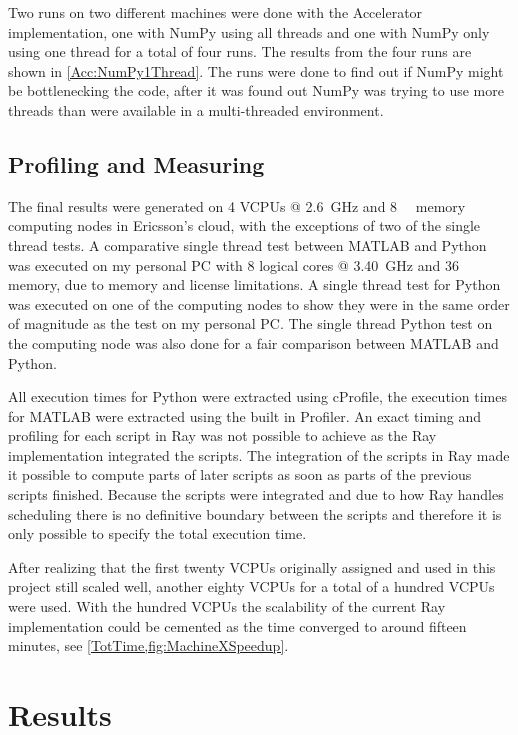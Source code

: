 \documentclass[12pt, a4paper]{article}
\begin{document}
Two runs on two different machines were done with the Accelerator implementation, one with NumPy using all threads and one with NumPy only using one thread for a total of four runs.
The results from the four runs are shown in \cref{Acc:NumPy1Thread}.
The runs were done to find out if NumPy might be bottlenecking the code, after it was found out NumPy was trying to use more threads than were available in a multi-threaded environment.

\subsection{Profiling and Measuring}

The final results were generated on 4 VCPUs @ \SI{2.6}{\giga\hertz} and \SI{8}{\giga\byte} memory computing nodes in Ericsson's cloud, with the exceptions of two of the single thread tests.
A comparative single thread test between MATLAB and Python was executed on my personal PC with 8 logical cores @ \SI{3.40}{\giga\hertz} and \SI{36}{\giga\byte} memory, due to memory and license limitations. 
A single thread test for Python was executed on one of the computing nodes to show they were in the same order of magnitude as the test on my personal PC.
The single thread Python test on the computing node was also done for a fair comparison between MATLAB and Python.

All execution times for Python were extracted using cProfile, the execution times for MATLAB were extracted using the built in Profiler.
An exact timing and profiling for each script in Ray was not possible to achieve as the Ray implementation integrated the scripts.
The integration of the scripts in Ray made it possible to compute parts of later scripts as soon as parts of the previous scripts finished.
Because the scripts were integrated and due to how Ray handles scheduling there is no definitive boundary between the scripts and therefore it is only possible to specify the total execution time.

After realizing that the first twenty VCPUs originally assigned and used in this project still scaled well, another eighty VCPUs for a total of a hundred VCPUs were used. With the hundred VCPUs the scalability of the current Ray implementation could be cemented as the time converged to around fifteen minutes, see \cref{TotTime,fig:MachineXSpeedup}.

\section{Results}
\end{document}

